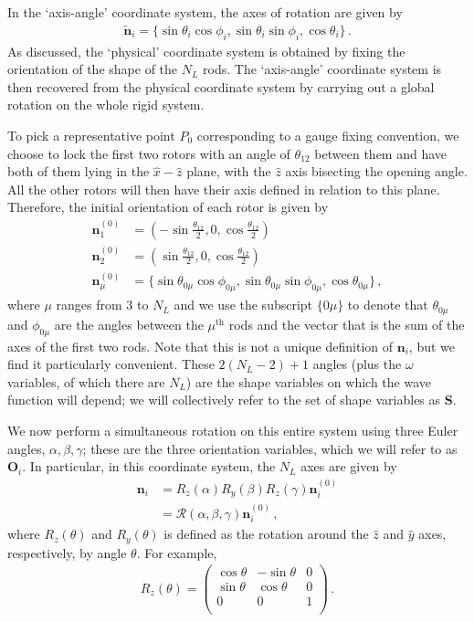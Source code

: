 \documentclass[reprint,superscriptaddress,pra,nofootinbib,preprintnumbers,floatfix]{revtex4-1}
\providecommand{\CR}{\mathcal{R}}
\begin{document}
In the `axis-angle' coordinate system, the axes of rotation are given by
%
\begin{align}
\tilde{\bm n}_i = \{\sin \theta_i \cos \phi_i, \sin \theta_i \sin \phi_i, \cos \theta_i\}
\,.
\end{align}
%
As discussed, the `physical' coordinate system is obtained by fixing the orientation of the shape of the $N_L$ rods. 
%
The `axis-angle' coordinate system is then recovered from the physical coordinate system by carrying out a global rotation on the whole rigid system. 

To pick a representative point $P_0$ corresponding to a gauge fixing convention, we choose to lock the first two rotors with an angle of $\theta_{12}$ between them and have both of them lying in the $\hat x-\hat z$ plane, with the $\hat z$ axis bisecting the opening angle. 
%
All the other rotors will then have their axis defined in relation to this plane. 
%
Therefore, the initial orientation of each rotor is given by
%
\begin{align}
\bm n_1^{(0)} &= \left(-\sin \frac{\theta_{12}}{2},0,\cos \frac{\theta_{12}}{2}\right) \nonumber \\
\bm n_2^{(0)}&=\left(\sin \frac{\theta_{12}}{2},0,\cos \frac{\theta_{12}}{2}\right) \nonumber \\
\bm n_\mu^{(0)} &= \{\sin \theta_{0\mu} \cos \phi_{0\mu}, \sin \theta_{0\mu} \sin \phi_{0\mu}, \cos \theta_{0\mu}\}
\,,
\end{align}
%
where $\mu$ ranges from 3 to $N_L$ and we use the subscript $\{0\mu\}$ to denote that $\theta_{0\mu}$ and $\phi_{0\mu}$ are the angles between the $\mu^\text{th}$ rods and the vector that is the sum of the axes of the first two rods. 
%
Note that this is not a unique definition of $\bm n_i$, but we find it particularly convenient. 
%
These $2 (N_L-2)+1$ angles (plus the $\omega$ variables, of which there are $N_L$) are the shape variables on which the wave function will depend; we will collectively refer to the set of shape variables as $\bm S$. 

We now perform a simultaneous rotation on this entire system using three Euler angles, $\alpha, \beta, \gamma$; these are the three orientation variables, which we will refer to as $\bm O_i$. 
%
In particular, in this coordinate system, the $N_L$ axes are given by
%
\begin{align}
\bm n_i &= R_z(\alpha)R_y(\beta)R_z(\gamma)\bm n^{(0)}_i \nonumber \\
&= \CR (\alpha, \beta, \gamma) \bm n^{(0)}_i
\,,
\label{eq:RotDef}
\end{align}
%
where $R_{z}(\theta)$ and $R_{y}(\theta)$ is defined as the rotation around the $\hat z$ and $\hat y$ axes, respectively, by angle $\theta$. 
%
For example, 
\begin{align}
R_z(\theta) = \left(
\begin{array}{ccc}
 \cos \theta  & -\sin \theta  & 0 \\
 \sin \theta  & \cos \theta  & 0 \\
 0 & 0 & 1 \\
\end{array}
\right)
\,.
\end{align}
\end{document}
